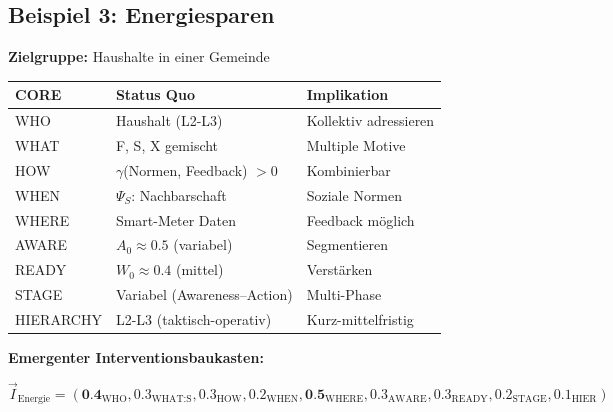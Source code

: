 \subsection{Beispiel 3: Energiesparen}
\label{sec:17-example-energy}

\begin{tcolorbox}[colback=green!5!white, colframe=green!75!black,
    title=\textbf{10C Status Quo: Energiesparen}]

\textbf{Zielgruppe:} Haushalte in einer Gemeinde

\begin{center}
\renewcommand{\arraystretch}{1.2}
\small
\begin{tabular}{@{}lll@{}}
\toprule
\textbf{CORE} & \textbf{Status Quo} & \textbf{Implikation} \\
\midrule
WHO & Haushalt (L2-L3) & Kollektiv adressieren \\
WHAT & F, S, X gemischt & Multiple Motive \\
HOW & $\gamma$(Normen, Feedback) $> 0$ & Kombinierbar \\
WHEN & $\Psi_S$: Nachbarschaft & Soziale Normen \\
WHERE & Smart-Meter Daten & Feedback m\"{o}glich \\
AWARE & $A_0 \approx 0.5$ (variabel) & Segmentieren \\
READY & $W_0 \approx 0.4$ (mittel) & Verst\"{a}rken \\
STAGE & Variabel (Awareness--Action) & Multi-Phase \\
HIERARCHY & L2-L3 (taktisch-operativ) & Kurz-mittelfristig \\
\bottomrule
\end{tabular}
\end{center}

\end{tcolorbox}

\textbf{Emergenter Interventionsbaukasten:}

\begin{equation}
\vec{I}_{\text{Energie}} = (\textbf{0.4}_{\text{WHO}}, 0.3_{\text{WHAT:S}}, 0.3_{\text{HOW}}, 0.2_{\text{WHEN}}, \textbf{0.5}_{\text{WHERE}}, 0.3_{\text{AWARE}}, 0.3_{\text{READY}}, 0.2_{\text{STAGE}}, 0.1_{\text{HIER}})
\end{equation}

